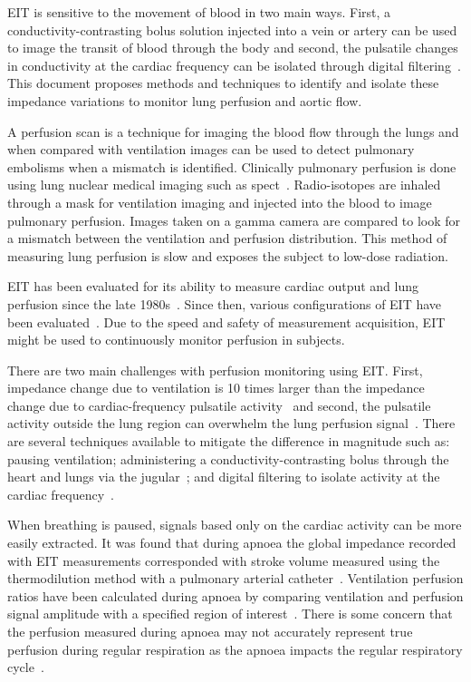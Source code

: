 EIT is sensitive to the movement of blood in two main ways. First, a conductivity-contrasting 
bolus solution injected into a vein or artery can be used to image the transit of blood through the body
and second, the pulsatile changes in conductivity at the cardiac frequency can be isolated 
through digital filtering~\parencite{Leathard1994}.
This document proposes methods and techniques to identify and isolate these impedance variations
to monitor lung perfusion and 
aortic flow.

A perfusion scan is a technique for imaging the blood flow through the lungs
and when compared with ventilation images can be used to detect pulmonary embolisms
when a mismatch is identified. Clinically pulmonary perfusion is done using 
lung nuclear medical imaging such as \acrfull{spect}~\parencite{Parker2012}. Radio-isotopes are inhaled through a mask 
for ventilation imaging and injected into the blood to image pulmonary perfusion. 
Images taken on a gamma camera are compared to look for a mismatch between the ventilation
and perfusion distribution. This method of 
measuring lung perfusion is slow and exposes the subject to low-dose radiation.

EIT has been evaluated for its ability to measure cardiac output and
lung perfusion since the late 1980s~\parencite{Eyuboglu1989,Blottt1992,Brown1992,Frerichs2002}. 
Since then, various configurations of EIT have been evaluated~\parencite{Borges2012,Nguyen2015}.
Due to the speed and safety of measurement acquisition, EIT might be used to continuously monitor 
perfusion in subjects.

There are two main challenges with perfusion monitoring using EIT. First, impedance change due to ventilation 
is 10 times larger than the impedance change due to cardiac-frequency pulsatile activity~\parencite{Deibele2008}
and second, the pulsatile activity outside the lung region can overwhelm the lung perfusion signal~\parencite{Stowe2019}. 
There are several techniques available to mitigate the difference 
in magnitude such as: pausing ventilation; administering a 
conductivity-contrasting bolus through the heart and lungs via the jugular~\parencite{Frerichs2002};
and digital filtering to isolate activity at the cardiac frequency~\parencite{Leathard1994}. 

When breathing is paused, signals based only on the cardiac activity 
can be more easily extracted. 
It was found that during apnoea the global impedance recorded with 
EIT measurements corresponded with stroke volume 
measured using the 
thermodilution method with a pulmonary arterial catheter~\parencite{Fagerberg2009}.
Ventilation perfusion ratios have been calculated during apnoea by comparing 
ventilation and perfusion signal amplitude with a specified region of 
interest~\parencite{Fagerberg2009a}.
There is some concern that the perfusion measured during apnoea may not accurately represent 
true perfusion during regular respiration as the apnoea impacts the regular respiratory cycle~\parencite{Leonhardt2012}.

